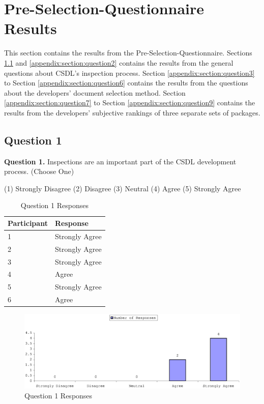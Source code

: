 \chapter{Pre-Selection-Questionnaire Results}
\label{appendix:chapter:pre-selection-questionnaire-results}
This section contains the results from the Pre-Selection-Questionnaire.
Sections \ref{appendix:section:question1} and \ref{appendix:section:question2} contains
the results from the general questions about CSDL's inspection process.
Section \ref{appendix:section:question3} to Section \ref{appendix:section:question6}
contains the results from the questions about the developers' document
selection method. Section \ref{appendix:section:question7} to Section
\ref{appendix:section:question9} contains the results from the developers'
subjective rankings of three separate sets of packages.

\clearpage
\section{Question 1}
\label{appendix:section:question1}
\noindent \textbf{Question 1.} Inspections are an important part of the CSDL
  development process. (Choose One)

(1) Strongly Disagree (2) Disagree (3) Neutral (4) Agree (5) Strongly Agree

\begin{table}[!h]
  \begin{center}
    \caption{Question 1 Responses}
    \label{tab:pre-selection-questionnaire-results-1}
    \begin{tabular}{|p{5.0cm}|p{8.0cm}|} \hline
{\bf Participant} & {\bf Response} \\ \hline
1 & Strongly Agree \\ \hline
2 & Strongly Agree \\ \hline
3 & Strongly Agree \\ \hline
4 & Agree \\ \hline
5 & Strongly Agree \\ \hline
6 & Agree \\ \hline
    \end{tabular}
  \end{center}
\end{table}

\begin{figure}[htb]
  \centering
  \includegraphics[width=1.0\textwidth]{figs/Results/pre-selection-questionnaire-1.eps}
  \caption{Question 1 Responses}
  \label{fig:pre-selection-questionnaire-results-1}
\end{figure}


